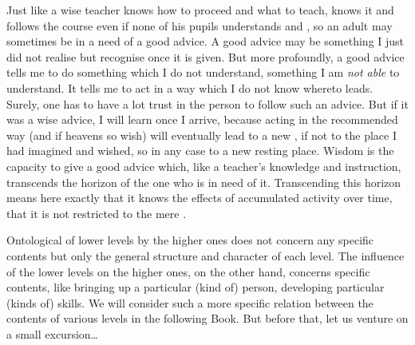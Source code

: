 
Just like a wise teacher knows how to proceed and what to teach, knows it and
follows the course even if none of his pupils understands  and
, so an adult may sometimes be in a need of a good advice.  A good
advice may be something I just did not realise but recognise once it is given.
But more profoundly, a good advice tells me to do something which I do not
understand, something I am {\em not able} to understand.  It tells me to act in
a way which I do not know whereto leads.  Surely, one has to have a lot trust in
the person to follow such an advice.  But if it was a wise advice, I will learn
once I arrive, because acting in the recommended way (and if heavens so wish)
will eventually lead to a new , if not to the place I had imagined and
wished, so in any case to a new resting place. Wisdom is the capacity to give a
good advice which, like a teacher's knowledge and instruction, transcends the
horizon of the one who is in need of it. Transcending this horizon means here
exactly that it knows the effects of accumulated activity over time, that it is
not restricted to the mere .

Ontological  of lower levels by the higher ones does not concern
any specific contents but only the general structure and character of each
level. The influence of the lower levels on the higher ones, on the other hand,
concerns specific contents, like bringing up a particular (kind of) person,
developing particular (kinds of) skills. We will consider such a more specific
relation between the contents of various levels in the following Book. But
before that, let us venture on a small excursion\ldots


